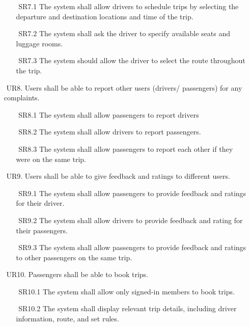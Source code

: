 \documentclass[a4paper, 12pt]{article} %
\begin{document}
\begin{itemize}
\begin{itemize}
                    \item [$ $] SR7.1 The system shall allow drivers to schedule trips by selecting the departure and destination locations and time of the trip.
                    \item [$ $] SR7.2  The system shall ask the driver to specify available seats and luggage rooms.
                    \item [$ $] SR7.3  The system should allow the driver to select the route throughout the trip.
                \end{itemize}
                \item [$ $] UR8. Users shall be able to report other users (drivers/ passengers) for any complaints. 
                \begin{itemize}
                    \item [$ $] SR8.1 The system shall allow passengers to report drivers 
                    \item [$ $] SR8.2 The system shall allow drivers to report passengers.
                    \item [$ $] SR8.3 The system shall allow passengers to report each other if they were on the same trip.
                    \end{itemize}
                \item [$ $] UR9. Users shall be able to give feedback and ratings to different users.
                \begin{itemize}
                    \item [$ $] SR9.1 The system shall allow passengers to provide feedback and ratings for their driver.
                    \item [$ $] SR9.2  The system shall allow drivers to provide feedback and rating for their passengers.
                    \item [$ $] SR9.3 The system shall allow passengers to provide feedback and ratings to other passengers on the same trip.
                \end{itemize}
                \item [$ $] UR10. Passengers shall be able to book trips.
                \begin{itemize}
                    \item [$ $] SR10.1 The system shall allow only signed-in members to book trips.
                    \item [$ $] SR10.2  The system shall display relevant trip details, including driver information, route, and set rules. 

\end{itemize}
\end{itemize}
\end{document}
